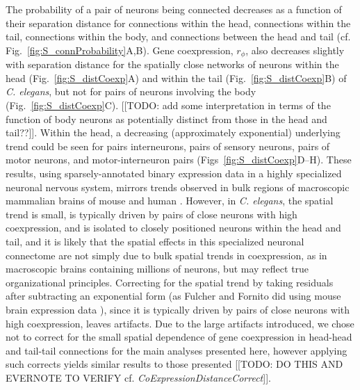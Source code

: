 \documentclass[10pt,letterpaper]{article}
\begin{document}
The probability of a pair of neurons being connected decreases as a function of their separation distance for connections within the head, connections within the tail, connections within the body, and connections between the head and tail (cf. Fig.~\ref{fig:S_connProbability}A,B).
Gene coexpression, $r_\phi$, also decreases slightly with separation distance for the spatially close networks of neurons within the head (Fig.~\ref{fig:S_distCoexp}A) and within the tail (Fig.~\ref{fig:S_distCoexp}B) of \emph{C. elegans}, but not for pairs of neurons involving the body (Fig.~\ref{fig:S_distCoexp}C).
[[TODO: add some interpretation in terms of the function of body neurons as potentially distinct from those in the head and tail??]].
Within the head, a decreasing (approximately exponential) underlying trend could be seen for pairs interneurons, pairs of sensory neurons, pairs of motor neurons, and motor-interneuron pairs (Figs~\ref{fig:S_distCoexp}D--H).
These results, using sparsely-annotated binary expression data in a highly specialized neuronal nervous system, mirrors trends observed in bulk regions of macroscopic mammalian brains of mouse \cite{Fulcher:2016ck} and human \cite{Krienen:2016eq}.
However, in \emph{C. elegans}, the spatial trend is small, is typically driven by pairs of close neurons with high coexpression, and is isolated to closely positioned neurons within the head and tail, and it is likely that the spatial effects in this specialized neuronal connectome are not simply due to bulk spatial trends in coexpression, as in macroscopic brains containing millions of neurons, but may reflect true organizational principles.
Correcting for the spatial trend by taking residuals after subtracting an exponential form (as Fulcher and Fornito did using mouse brain expression data \cite{Fulcher:2016ck}), since it is typically driven by pairs of close neurons with high coexpression, leaves artifacts.
Due to the large artifacts introduced, we chose not to correct for the small spatial dependence of gene coexpression in head-head and tail-tail connections for the main analyses presented here, however applying such corrects yields similar results to those presented [[TODO: DO THIS AND EVERNOTE TO VERIFY cf. \emph{CoExpressionDistanceCorrect}]].
\end{document}
